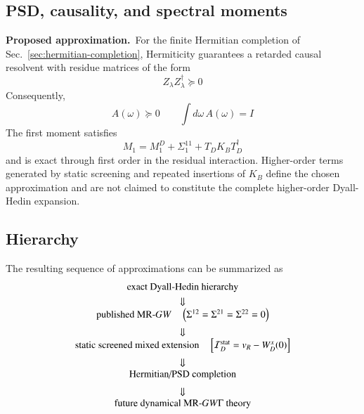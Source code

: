 \documentclass[aip,jcp,reprint,noshowkeys,superscriptaddress]{revtex4-1}
\newcommand{\Proposed}{\textbf{Proposed approximation.}\ }
\begin{document}
\subsection{PSD, causality, and spectral moments}

\Proposed For the finite Hermitian completion of
Sec.~\ref{sec:hermitian-completion}, Hermiticity guarantees a retarded causal
resolvent with residue matrices of the form
\begin{equation}
  Z_\lambda Z_\lambda^\dagger\succeq0
\end{equation}
Consequently,
\begin{equation}
  A(\omega)\succeq0
  \qquad
  \int d\omega\,A(\omega)=I
\end{equation}
The first moment satisfies
\begin{equation}
  M_1
  =
  M_1^D
  +
  \Sigma_1^{11}
  +
  T_DK_BT_D^\dagger
\end{equation}
and is exact through first order in the residual interaction.  Higher-order
terms generated by static screening and repeated insertions of $K_B$ define
the chosen approximation and are not claimed to constitute the complete
higher-order Dyall-Hedin expansion.
\subsection{Hierarchy}

The resulting sequence of approximations can be summarized as
\begin{equation}
  \begin{array}{c}
  \text{exact Dyall-Hedin hierarchy}
  \\[1mm]
  \Downarrow
  \\
  \text{published MR-}GW
  \quad
  \left(
    \Sigma^{12}
    =
    \Sigma^{21}
    =
    \Sigma^{22}
    =
    0
  \right)
  \\[2mm]
  \Downarrow
  \\
  \text{static screened mixed extension}
  \quad
  \left[
    \mathcal I_D^{\rm stat}
    =
    v_R-W_D^x(0)
  \right]
  \\[2mm]
  \Downarrow
  \\
  \text{Hermitian/PSD completion}
  \\[2mm]
  \Downarrow
  \\
  \text{future dynamical MR-}GW\Gamma
  \text{ theory}
  \end{array}
\end{equation}
\end{document}
